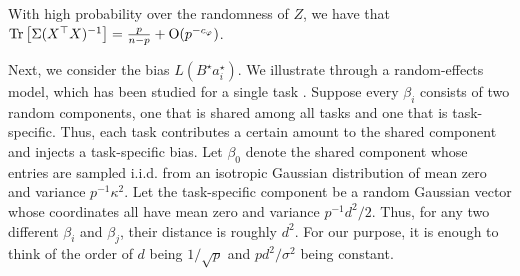 \begin{fact}\label{fact_tr}
	With high probability over the randomness of $Z$, we have that $\operatorname{Tr}\left[\Sigma (X^{\top} X)^{-1}\right] = \frac{p}{n - p} + \operatorname{O}(p^{-c_{\varphi}})$.
\end{fact}


Next, we consider the bias $L(B^{\star} a^{\star}_i)$.
We illustrate through a random-effects model, which has been studied for a single task \cite{dobriban2020wonder}.
Suppose every $\beta_i$ consists of two random components, one that is shared among all tasks and one that is task-specific.
Thus, each task contributes a certain amount to the shared component and injects a task-specific bias.
Let $\beta_0$ denote the shared component whose entries are sampled i.i.d. from an isotropic Gaussian distribution of mean zero and variance $p^{-1}\kappa^2$.
Let the task-specific component be a random Gaussian vector whose coordinates all have mean zero and variance $p^{-1} d^2 / 2$.
Thus, for any two different $\beta_i$ and $\beta_j$, their distance is roughly $d^2$.
For our purpose, it is enough to think of the order of $d$ being $1/\sqrt{p}$ and $pd^2/\sigma^2$ being constant.

